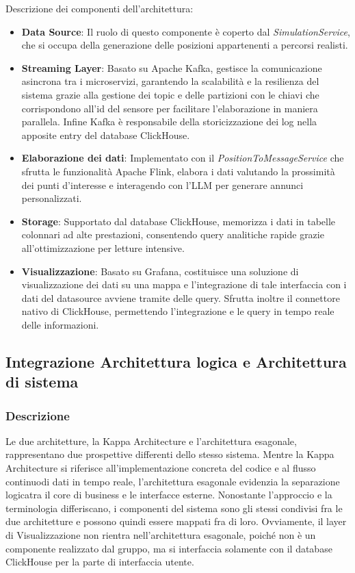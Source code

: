 \documentclass[10pt]{article}
\begin{document}
Descrizione dei componenti dell'architettura:
\begin{itemize}
    \item \textbf{Data Source}: Il ruolo di questo componente è coperto dal \textit{SimulationService}, che si occupa della generazione delle posizioni appartenenti a percorsi realisti.
    \item \textbf{Streaming Layer}: Basato su Apache Kafka, gestisce la comunicazione asincrona tra i microservizi, garantendo la scalabilità e la resilienza del sistema grazie alla gestione dei topic e delle partizioni con le chiavi che corrispondono all'id del sensore per facilitare l'elaborazione in maniera parallela. Infine Kafka è responsabile della storicizzazione dei log nella apposite entry del database ClickHouse.
    \item \textbf{Elaborazione dei dati}: Implementato con il \textit{PositionToMessageService} che sfrutta le funzionalità Apache Flink, elabora i dati valutando la prossimità dei punti d’interesse e interagendo con l’LLM per generare annunci personalizzati.
    \item \textbf{Storage}: Supportato dal database ClickHouse, memorizza i dati in tabelle colonnari ad alte prestazioni, consentendo query analitiche rapide grazie all’ottimizzazione per letture intensive.
    \item \textbf{Visualizzazione}: Basato su Grafana, costituisce una soluzione di visualizzazione dei dati su una mappa e l'integrazione di tale interfaccia con i dati del datasource avviene tramite delle query. Sfrutta inoltre il connettore nativo di ClickHouse, permettendo l'integrazione e le query in tempo reale delle informazioni.
\end{itemize}




\subsection{Integrazione Architettura logica e Architettura di sistema}
\subsubsection{Descrizione}
Le due architetture, la Kappa Architecture e l'architettura esagonale, rappresentano due prospettive differenti dello stesso sistema.
Mentre la Kappa Architecture si riferisce all’implementazione concreta del codice e al flusso continuodi dati in tempo reale, l’architettura esagonale evidenzia la separazione logicatra il core di business e le interfacce esterne.
Nonostante l'approccio e la terminologia differiscano, i componenti  del sistema sono gli stessi condivisi fra le due architetture e possono quindi essere mappati fra di loro.
Ovviamente, il layer di Visualizzazione non rientra nell'architettura esagonale, poiché non è un componente realizzato dal gruppo, ma si interfaccia solamente con il database ClickHouse per la parte di interfaccia utente.
\end{document}
